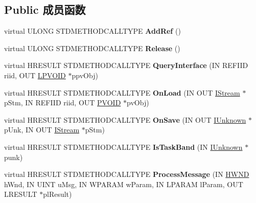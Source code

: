 \subsection*{Public 成员函数}
\begin{DoxyCompactItemize}
\item 
\mbox{\label{class_c_tray_band_site_a445711c864453a17f223894baa78da99}} 
virtual U\+L\+O\+NG S\+T\+D\+M\+E\+T\+H\+O\+D\+C\+A\+L\+L\+T\+Y\+PE {\bfseries Add\+Ref} ()
\item 
\mbox{\label{class_c_tray_band_site_a20f4cd80232401a277928dc8ac8c30e1}} 
virtual U\+L\+O\+NG S\+T\+D\+M\+E\+T\+H\+O\+D\+C\+A\+L\+L\+T\+Y\+PE {\bfseries Release} ()
\item 
\mbox{\label{class_c_tray_band_site_a6add53c017e12a8b8edaf99f7d18d18d}} 
virtual H\+R\+E\+S\+U\+LT S\+T\+D\+M\+E\+T\+H\+O\+D\+C\+A\+L\+L\+T\+Y\+PE {\bfseries Query\+Interface} (IN R\+E\+F\+I\+ID riid, O\+UT \hyperlink{interfacevoid}{L\+P\+V\+O\+ID} $\ast$ppv\+Obj)
\item 
\mbox{\label{class_c_tray_band_site_a57f5bee9f4351d309ffc918ae2079707}} 
virtual H\+R\+E\+S\+U\+LT S\+T\+D\+M\+E\+T\+H\+O\+D\+C\+A\+L\+L\+T\+Y\+PE {\bfseries On\+Load} (IN O\+UT \hyperlink{interface_i_stream}{I\+Stream} $\ast$p\+Stm, IN R\+E\+F\+I\+ID riid, O\+UT \hyperlink{interfacevoid}{P\+V\+O\+ID} $\ast$pv\+Obj)
\item 
\mbox{\label{class_c_tray_band_site_a535c68d3aa45bca60f356b397c00c2f0}} 
virtual H\+R\+E\+S\+U\+LT S\+T\+D\+M\+E\+T\+H\+O\+D\+C\+A\+L\+L\+T\+Y\+PE {\bfseries On\+Save} (IN O\+UT \hyperlink{interface_i_unknown}{I\+Unknown} $\ast$p\+Unk, IN O\+UT \hyperlink{interface_i_stream}{I\+Stream} $\ast$p\+Stm)
\item 
\mbox{\label{class_c_tray_band_site_af4da68541d3775a9bb9fd274e89aa041}} 
virtual H\+R\+E\+S\+U\+LT S\+T\+D\+M\+E\+T\+H\+O\+D\+C\+A\+L\+L\+T\+Y\+PE {\bfseries Is\+Task\+Band} (IN \hyperlink{interface_i_unknown}{I\+Unknown} $\ast$punk)
\item 
\mbox{\label{class_c_tray_band_site_af5b642a5a48d3e566e0600f2c77ba4a0}} 
virtual H\+R\+E\+S\+U\+LT S\+T\+D\+M\+E\+T\+H\+O\+D\+C\+A\+L\+L\+T\+Y\+PE {\bfseries Process\+Message} (IN \hyperlink{interfacevoid}{H\+W\+ND} h\+Wnd, IN U\+I\+NT u\+Msg, IN W\+P\+A\+R\+AM w\+Param, IN L\+P\+A\+R\+AM l\+Param, O\+UT L\+R\+E\+S\+U\+LT $\ast$pl\+Result)

\end{DoxyCompactItemize}
